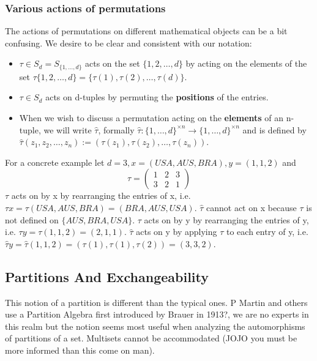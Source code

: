 \documentclass{article}
\theoremstyle{definition}
\begin{document}
\subsubsection{Various actions of permutations}
The actions of permutations on different mathematical objects can be a bit confusing. We desire to be clear and consistent with our notation:
\begin{itemize}
\item $\tau \in S_d= S_{\{1,\dots,d\}}$ acts on the set $\{1,2,\dots,d\}$ by acting on the elements of the set $\tau\{1,2,\dots,d\} = \{\tau(1),\tau(2),\dots,\tau(d)\}$.
\item $\tau\in S_d$ acts on d-tuples by permuting the \textbf{positions} of the entries.
\item When we wish to discuss a permutation acting on the \textbf{elements} of an n-tuple, we will write $\hat{\tau}$, formally $\hat{\tau}:\{1,\dots,d\}^{\times n} \rightarrow \{1,\dots,d\}^{\times n}$ and is defined by $\hat{\tau}(z_1,z_2,\dots,z_n) := (\tau(z_1),\tau(z_2),\dots,\tau(z_n))$.
\end{itemize}

For a concrete example let $d=3, x=(USA,AUS,BRA), y=(1,1,2)$ and 
$$\tau = \begin{pmatrix} 1 & 2 & 3\\ 3 & 2 & 1 \end{pmatrix}$$
$\tau$ acts on by x by rearranging the entries of x, i.e. $\tau x = \tau(USA,AUS,BRA) =(BRA,AUS,USA)$. $\hat{\tau}$ cannot act on x because $\tau$ is not defined on $\{AUS,BRA,USA\}$.
$\tau$ acts on by y by rearranging the entries of y, i.e. $\tau y = \tau(1,1,2) =(2,1,1)$. $\hat{\tau}$ acts on y by applying $\tau$ to each entry of y, i.e. $\hat{\tau}y = \hat{\tau}(1,1,2) =(\tau(1),\tau(1),\tau(2) ) =(3,3,2)$.

\subsection{Partitions And Exchangeability}
This notion of a partition is different than the typical ones. P Martin and others use a Partition Algebra first introduced by Brauer in 1913?, we are no experts in this realm but the notion seems most useful when analyzing the automorphisms of partitions of a set. Multisets cannot be accommodated (JOJO you must be more informed than this come on man).
\end{document}
